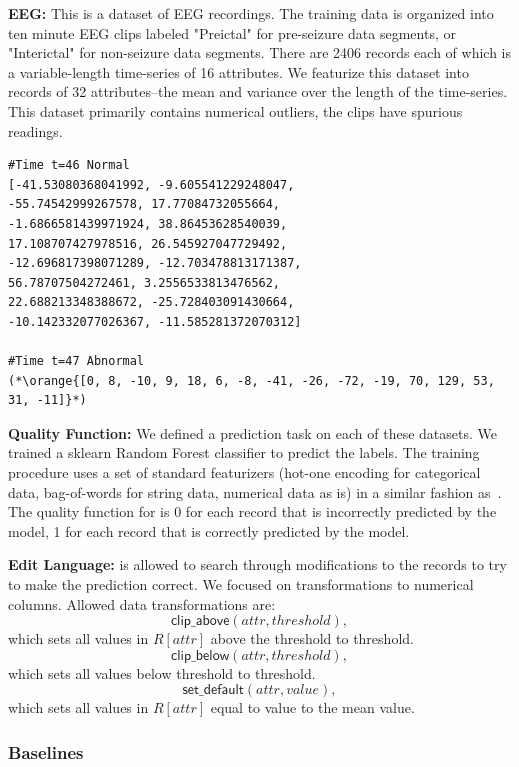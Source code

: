 \vspace{0.5em}\noindent\textbf{EEG: } This is a dataset of EEG recordings. 
The training data is organized into ten minute EEG clips labeled "Preictal" for pre-seizure data segments, or "Interictal" for non-seizure data segments. 
There are 2406 records each of which is a variable-length time-series of 16 attributes. We featurize this dataset into records of 32 attributes--the mean and variance over the length of the time-series. 
This dataset primarily contains numerical outliers, the clips have spurious readings.
\begin{lstlisting}
#Time t=46 Normal
[-41.53080368041992, -9.605541229248047, 
-55.74542999267578, 17.77084732055664,
-1.6866581439971924, 38.86453628540039, 
17.108707427978516, 26.545927047729492, 
-12.696817398071289, -12.703478813171387, 
56.78707504272461, 3.2556533813476562, 
22.688213348388672, -25.728403091430664, 
-10.142332077026367, -11.585281372070312]

#Time t=47 Abnormal
(*\orange{[0, 8, -10, 9, 18, 6, -8, -41, -26, -72, -19, 70, 129, 53, 31, -11]}*)
\end{lstlisting} 

\vspace{0.5em}\noindent\textbf{Quality Function: } We defined a prediction task on each of these datasets. We trained a \textsf{sklearn} Random Forest classifier to predict the labels. The training procedure uses a set of standard featurizers (hot-one encoding for categorical data, bag-of-words for string data, numerical data as is) in a similar fashion as~\cite{gokhale2014corleone}. The quality function for \sys is 0 for each record that is incorrectly predicted by the model, 1 for each record that is correctly predicted by the model.

\vspace{0.5em}\noindent\textbf{Edit Language: } \sys is allowed to search through modifications to the records to try to make the prediction correct. We focused on transformations to numerical columns. Allowed data transformations are:
\[
\textsf{clip\_above}(attr, threshold), 
\]
which sets all values in $R[attr]$ above the threshold to threshold.
\[
\textsf{clip\_below}(attr, threshold), 
\]
which sets all values below threshold to threshold.
\[
\textsf{set\_default}(attr, value), 
\]
which sets all values in $R[attr]$ equal to value to the mean value.


\subsubsection{Baselines}

